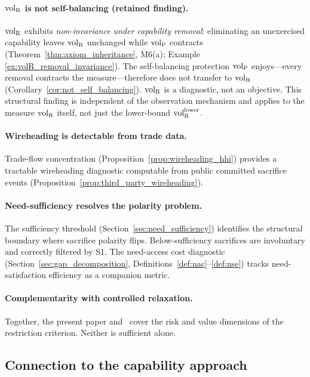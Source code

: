 \paragraph{${\operatorname{vol}_{\mathrm{R}}}$ is not self-balancing (retained finding).}
${\operatorname{vol}_{\mathrm{R}}}$ exhibits \emph{non-invariance under capability
removal}: eliminating an unexercised capability leaves ${\operatorname{vol}_{\mathrm{R}}}$
unchanged while ${\operatorname{vol}_{\mathrm{P}}}$ contracts
(Theorem~\ref{thm:axiom_inheritance}, M6(a); Example
\ref{ex:volR_removal_invariance}).  The self-balancing
protection ${\operatorname{vol}_{\mathrm{P}}}$ enjoys---every removal contracts the
measure---therefore does not transfer to ${\operatorname{vol}_{\mathrm{R}}}$
(Corollary~\ref{cor:not_self_balancing}).  ${\operatorname{vol}_{\mathrm{R}}}$ is a
diagnostic, not an objective.  This structural finding is
independent of the observation mechanism and applies to the
measure ${\operatorname{vol}_{\mathrm{R}}}$ itself, not just the lower-bound
${\operatorname{vol}_{\mathrm{R}}^{\mathrm{lower}}}$.

\paragraph{Wireheading is detectable from trade data.}
Trade-flow concentration
(Proposition~\ref{prop:wireheading_hhi}) provides a tractable
wireheading diagnostic computable from public committed sacrifice
events
(Proposition~\ref{prop:third_party_wireheading}).

\paragraph{Need-sufficiency resolves the polarity problem.}
The sufficiency threshold
(Section~\ref{sec:need_sufficiency}) identifies the structural
boundary where sacrifice polarity flips.  Below-sufficiency
sacrifices are involuntary and correctly filtered by S1.  The
need-access cost diagnostic
(Section~\ref{sec:gap_decomposition},
Definitions~\ref{def:nac}--\ref{def:nse}) tracks
need-satisfaction efficiency as a companion metric.

\paragraph{Complementarity with controlled relaxation.}
Together, the present paper
and~\citep{lasser2026wamura} cover the risk and value dimensions
of the restriction criterion.  Neither is sufficient alone.

\subsection{Connection to the capability approach}

